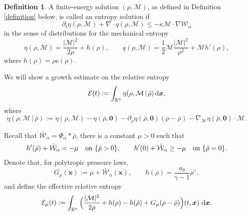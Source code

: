 \documentclass[reqno,11pt]{amsart}
\numberwithin{equation}{section}
\theoremstyle{definition}
\newtheorem{definition}[theorem]{Definition}
\def\dd{{\, \rm d}}
\begin{document}
\begin{definition}\label{globalweak}
    A finite-energy solution $(\rho,\mathcal{M})$, as defined in Definition \ref{definition} below,
    is called an entropy solution if
    \[
 \partial_t \eta(\rho,\mathcal{M}) + \nabla \cdot q(\rho,\mathcal{M}) \leq -\kappa \mathcal{M}\cdot\nabla \mathcal{W}_\alpha
    \]
    in the sense of distributions for the mechanical entropy
    \[ \eta(\rho, \mathcal{M})
  = \frac{|\mathcal{M}|^{2}}{2\rho} + h(\rho),
  \qquad
  q(\rho,\mathcal{M})
  =\frac12 \mathcal{M}\frac{|\mathcal{M}|^{2}}{\rho^{2}}+\mathcal{M}h'(\rho),
\]
where $h(\rho) = \rho e(\rho)$.
\end{definition}
We will show a growth estimate on the relative entropy
\begin{equation*}
    \mathcal{E}(t) := \int_{\mathbb{R}^n} \eta(\rho,\mathcal{M} \,|\, \bar{\rho}) \dd \boldsymbol{x},
\end{equation*}
where 
\[
 \eta(\rho,\mathcal{M} \,|\, \bar{\rho}) := \eta(\rho,\mathcal{M})-\eta(\bar\rho,\boldsymbol{0})
 -\partial_{\rho}\eta(\bar\rho,\boldsymbol{0})(\rho-\bar\rho)
 -\nabla_{\mathcal{M}}\eta(\bar\rho,\boldsymbol{0})\cdot \mathcal{M}.
\] 

Recall that 
$\bar{\mathcal W}_\alpha=\Phi_\alpha*\bar\rho$, there is a constant $\mu>0$ such that
\[ h'(\bar\rho)+\bar{\mathcal W}_\alpha=-\mu \quad\hbox{on }\{\bar\rho>0\},
\qquad
h'(0)+\bar{\mathcal W}_\alpha\ge -\mu
 \quad\hbox{on }\{\bar\rho=0\}.
\]
Denote that, for polytropic pressure laws, 
\[
 G_\mu(\boldsymbol{x}):=\mu+\bar{\mathcal W}_\alpha(\boldsymbol{x}),
 \qquad
 h(\rho)=\frac{a_0}{\gamma-1}\rho^\gamma,
\]
and define the effective relative entropy
\[
\mathcal E_\mu(t):= \int_{\mathbb R^n}\Big( \frac{|\mathcal M|^2}{2\rho} +h(\rho)-h(\bar\rho)+G_\mu(\rho-\bar\rho)\Big)(t,\boldsymbol{x})\,\dd\boldsymbol{x}.
\]
\end{document}
